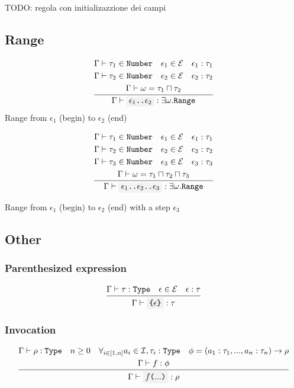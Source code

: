 \documentclass[11pt]{report}
\newcommand{\infrule}[3][gathered]{\frac{\begin{#1}#2\end{#1}}{\begin{gathered}#3\end{gathered}}}
\newcommand{\then}{\vdash}
\newcommand{\code}[1]{\texttt{\colorbox{gray!10}{#1}}}
\newcommand{\expr}{\epsilon}
\newcommand{\Id}{\mathcal{I}}
\newcommand{\Expr}{\mathcal{E}}
\newcommand{\Type}{\texttt{Type}}
\newcommand{\Range}{\texttt{Range}}
\newcommand{\Env}{\Gamma}
\theoremstyle{definition}
\newcommand{\comment}[1]{
	\parbox{0.9\linewidth}{\color{black!30}\small\sffamily #1}
}
\begin{document}
\comment{TODO: regola con initializazzione dei campi}

\subsection{Range}

\[
	\infrule{
		\Env\then \tau_1 \in \texttt{Number} \quad \expr_1\in\Expr \quad \expr_1:\tau_1\\*
		\Env\then \tau_2 \in \texttt{Number} \quad \expr_2\in\Expr \quad \expr_2:\tau_2 \\*
		\Env\then \omega = \tau_1 \sqcap \tau_2
	}{
		\Env\then \code{$\expr_1$..$\expr_2$} : \exists\omega.\Range
	}
\]
Range from $\expr_1$ (begin) to $\expr_2$ (end)

\[
	\infrule{
		\Env\then \tau_1 \in \texttt{Number} \quad \expr_1\in\Expr \quad \expr_1:\tau_1\\*
		\Env\then \tau_2 \in \texttt{Number} \quad \expr_2\in\Expr \quad \expr_2:\tau_2 \\*
		\Env\then \tau_3 \in \texttt{Number} \quad \expr_3\in\Expr \quad \expr_3:\tau_3 \\*
		\Env\then \omega = \tau_1 \sqcap \tau_2 \sqcap \tau_3
	}{
		\Env\then \code{$\expr_1$..$\expr_2$..$\expr_3$} : \exists\omega.\Range
	}
\]

Range from $\expr_1$ (begin) to $\expr_2$ (end) with a step $\expr_3$

\newpage

\subsection{Other}

\subsubsection{Parenthesized expression}

\[
	\infrule{
		\Env\then \tau:\Type \quad \expr\in\Expr \quad \expr:\tau
	}{
		\Env\then \code{\{$\expr$\}} : \tau
	}
\]

\subsubsection{Invocation}

\[
	\infrule{
		\Env\then \rho:\Type \quad n \geq 0 \quad \forall_{i\in[1,n]}{a_i \in \Id, \tau_i:\Type} \quad \phi = (a_1:\tau_1,...,a_n:\tau_n) \to \rho \\*
		\Env\then f : \phi
	}{
		\Env\then \code{$f$($...$)} : \rho
	}
\]
\end{document}
